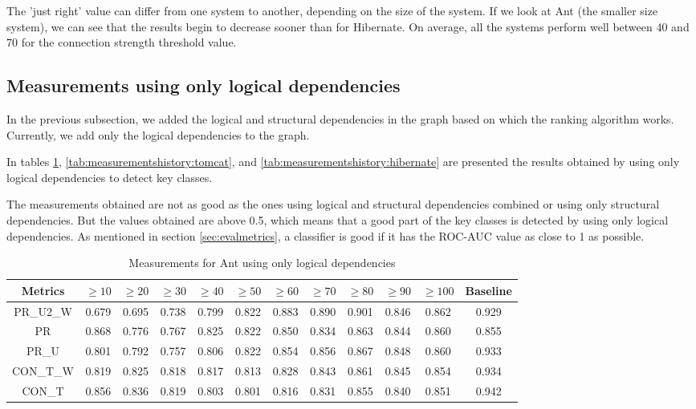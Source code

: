 \documentclass[runningheads]{comsis2}
\begin{document}
The 'just right' value can differ from one system to another, depending on the size of the system. If we look at Ant (the smaller size system), we can see that the results begin to decrease sooner than for Hibernate. On average, all the systems perform well between 40 and 70 for the connection strength threshold value.




\subsection{Measurements using only logical dependencies}
\label{sec:measure_ld}


In the previous subsection, we added the logical and structural dependencies in the graph based on which the ranking algorithm works. Currently, we add only the logical dependencies to the graph.

In tables \ref{tab:measurementshistory:ant}, \ref{tab:measurementshistory:tomcat}, and \ref{tab:measurementshistory:hibernate} are presented the results obtained by using only logical dependencies to detect key classes.

The measurements obtained are not as good as the ones using logical and structural dependencies combined or using only structural dependencies. But the values obtained are above 0.5, which means that a good part of the key classes is detected by using only logical dependencies. As mentioned in section \ref{sec:evalmetrics}, a classifier is good if it has the ROC-AUC value as close to 1 as possible.


\begin{table}[!h]
\setlength\tabcolsep{3.5pt}
\caption{Measurements for Ant using only logical dependencies}
\label{tab:measurementshistory:ant}
\centering
\begin{tabular}{|c|cccccccccc|c|}
\hline
Metrics &	$\geq10$	&	$\geq20$		&	$\geq30$		&	$\geq40$		&	$\geq50$		&	$\geq60$		&	$\geq70$		&	$\geq80$		&	$\geq90$		&	$\geq100$		&	Baseline \\
\hline

PR\_U2\_W	&	0.679	&	0.695	&	0.738	&	0.799	&	0.822	&	0.883	&	0.890	&	0.901	&	0.846	&	0.862	&	0.929	\\
PR	&	0.868	&	0.776	&	0.767	&	0.825	&	0.822	&	0.850	&	0.834	&	0.863	&	0.844	&	0.860	&	0.855	\\
PR\_U	&	0.801	&	0.792	&	0.757	&	0.806	&	0.822	&	0.854	&	0.856	&	0.867	&	0.848	&	0.860	&	0.933	\\
CON\_T\_W	&	0.819	&	0.825	&	0.818	&	0.817	&	0.813	&	0.828	&	0.843	&	0.861	&	0.845	&	0.854	&	0.934	\\
CON\_T	&	0.856	&	0.836	&	0.819	&	0.803	&	0.801	&	0.816	&	0.831	&	0.855	&	0.840	&	0.851	&	0.942	\\


\hline
\end{tabular}
\end{table}
\end{document}
